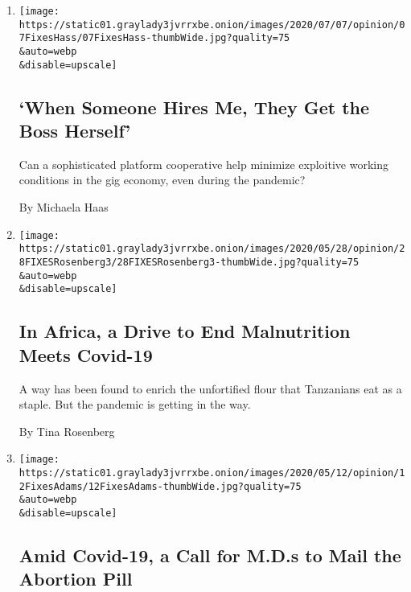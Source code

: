 \begin{enumerate}
\def\labelenumi{\arabic{enumi}.}
\item
  \href{/2020/07/07/opinion/gig-economy-immigrants-fair-wage.html}{}

  \texttt{[image: https://static01.graylady3jvrrxbe.onion/images/2020/07/07/opinion/07FixesHass/07FixesHass-thumbWide.jpg?quality=75\\\&auto=webp\\\&disable=upscale]}

  \hypertarget{when-someone-hires-me-they-get-the-boss-herself}{%
  \subsection{`When Someone Hires Me, They Get the Boss
  Herself'}\label{when-someone-hires-me-they-get-the-boss-herself}}

  Can a sophisticated platform cooperative help minimize exploitive
  working conditions in the gig economy, even during the pandemic?

  By Michaela Haas
\item
  \href{/2020/05/28/opinion/coronavirus-africa-malnutrition.html}{}

  \texttt{[image: https://static01.graylady3jvrrxbe.onion/images/2020/05/28/opinion/28FIXESRosenberg3/28FIXESRosenberg3-thumbWide.jpg?quality=75\\\&auto=webp\\\&disable=upscale]}

  \hypertarget{in-africa-a-drive-to-end-malnutrition-meets-covid-19}{%
  \subsection{In Africa, a Drive to End Malnutrition Meets
  Covid-19}\label{in-africa-a-drive-to-end-malnutrition-meets-covid-19}}

  A way has been found to enrich the unfortified flour that Tanzanians
  eat as a staple. But the pandemic is getting in the way.

  By Tina Rosenberg
\item
  \href{/2020/05/12/opinion/covid-abortion-pill.html}{}

  \texttt{[image: https://static01.graylady3jvrrxbe.onion/images/2020/05/12/opinion/12FixesAdams/12FixesAdams-thumbWide.jpg?quality=75\\\&auto=webp\\\&disable=upscale]}

  \hypertarget{amid-covid-19-a-call-for-mds-to-mail-the-abortion-pill}{%
  \subsection{Amid Covid-19, a Call for M.D.s to Mail the Abortion
  Pill}\label{amid-covid-19-a-call-for-mds-to-mail-the-abortion-pill}}


\end{enumerate}
